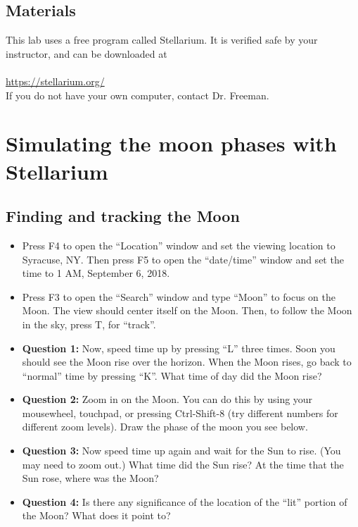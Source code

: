 \documentclass[11pt]{article}
\begin{document}
\subsection*{Materials}

This lab uses a free program called Stellarium. It is verified safe by your instructor, and can be downloaded at  \\
\\
\url{https://stellarium.org/} \\

If you do not have your own computer, contact Dr. Freeman.

\newpage

\section{Simulating the moon phases with Stellarium}

\subsection{Finding and tracking the Moon}

\begin{itemize}

\item Press F4 to open the ``Location'' window and set the viewing location to Syracuse, NY. Then press F5 to open the ``date/time''
window and set the time to 1 AM, September 6, 2018.

\item Press F3 to open the ``Search'' window and type ``Moon'' to focus on the Moon. The view should center itself on the Moon. Then,
to follow the Moon in the sky, press T, for ``track''.

\item {\bf Question 1:} Now, speed time up by pressing ``L'' three times. Soon you should see the Moon rise over the horizon. When the Moon rises, go back to ``normal'' time by pressing ``K''. What time of day
did the Moon rise?

\vspace{1in}

\item {\bf Question 2:} Zoom in on the Moon. You can do this by using your mousewheel, touchpad, or pressing Ctrl-Shift-8 (try 
different numbers for different zoom levels). Draw the phase of the moon you see below.

\vspace{2in}

\item {\bf Question 3:} Now speed time up again and wait for the Sun to rise. (You may need to zoom out.) 
What time did the Sun rise? At the time that the Sun rose, where was the Moon?

\vspace{1in}

\item {\bf Question 4:} Is there any significance of the location of the ``lit'' portion of the Moon? What does it point to?

\vspace{1in}
\end{itemize}
\end{document}
